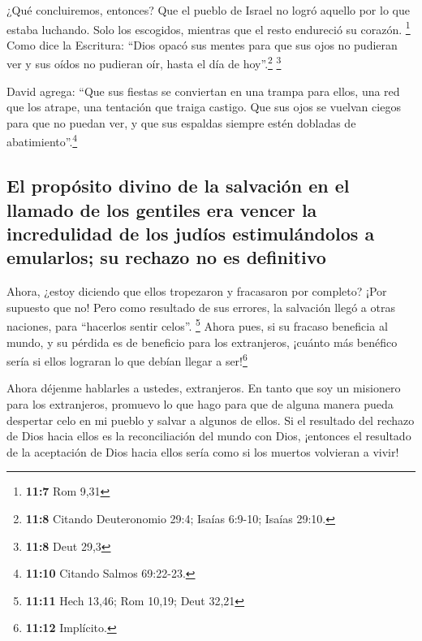  ¿Qué concluiremos, entonces? Que el pueblo de Israel no
logró aquello por lo que estaba luchando. Solo los escogidos, mientras
que el resto endureció su corazón. \footnote{\textbf{11:7} Rom 9,31}
 Como dice la Escritura: ``Dios opacó sus mentes para que
sus ojos no pudieran ver y sus oídos no pudieran oír, hasta el día de
hoy''.\footnote{\textbf{11:8} Citando Deuteronomio 29:4; Isaías 6:9-10;
  Isaías 29:10.} \footnote{\textbf{11:8} Deut 29,3}

 David agrega: ``Que sus fiestas se conviertan en una
trampa para ellos, una red que los atrape, una tentación que traiga
castigo.  Que sus ojos se vuelvan ciegos para que no
puedan ver, y que sus espaldas siempre estén dobladas de
abatimiento''.\footnote{\textbf{11:10} Citando Salmos 69:22-23.}

\hypertarget{el-propuxf3sito-divino-de-la-salvaciuxf3n-en-el-llamado-de-los-gentiles-era-vencer-la-incredulidad-de-los-juduxedos-estimuluxe1ndolos-a-emularlos-su-rechazo-no-es-definitivo}{%
\subsection{El propósito divino de la salvación en el llamado de los
gentiles era vencer la incredulidad de los judíos estimulándolos a
emularlos; su rechazo no es
definitivo}\label{el-propuxf3sito-divino-de-la-salvaciuxf3n-en-el-llamado-de-los-gentiles-era-vencer-la-incredulidad-de-los-juduxedos-estimuluxe1ndolos-a-emularlos-su-rechazo-no-es-definitivo}}

 Ahora, ¿estoy diciendo que ellos tropezaron y fracasaron
por completo? ¡Por supuesto que no! Pero como resultado de sus errores,
la salvación llegó a otras naciones, para ``hacerlos sentir celos''.
\footnote{\textbf{11:11} Hech 13,46; Rom 10,19; Deut 32,21}
 Ahora pues, si su fracaso beneficia al mundo, y su
pérdida es de beneficio para los extranjeros, ¡cuánto más benéfico sería
si ellos lograran lo que debían llegar a ser!\footnote{\textbf{11:12}
  Implícito.}

 Ahora déjenme hablarles a ustedes, extranjeros. En tanto
que soy un misionero para los extranjeros, promuevo lo que hago
 para que de alguna manera pueda despertar celo en mi
pueblo y salvar a algunos de ellos.  Si el resultado del
rechazo de Dios hacia ellos es la reconciliación del mundo con Dios,
¡entonces el resultado de la aceptación de Dios hacia ellos sería como
si los muertos volvieran a vivir!

